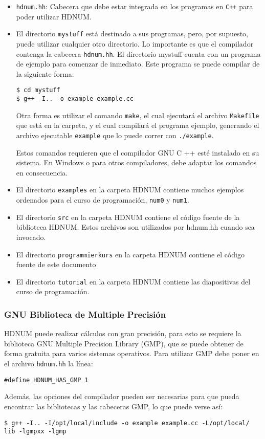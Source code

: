 \documentclass[a4paper,11pt]{article}
\theoremstyle{definition}
\begin{document}
\begin{itemize}
\item \lstinline{hdnum.hh}: Cabecera que debe estar integrada en los programas en \lstinline{C++} para poder utilizar HDNUM.
\item 
El directorio \lstinline{mystuff} está destinado a sus programas, pero, por supuesto, puede utilizar cualquier otro directorio. Lo  importante es que el compilador contenga la cabecera \lstinline{hdnum.hh}. El directorio mystuff cuenta con un programa de ejemplo para comenzar de inmediato. Este programa se puede compilar de la siguiente forma:

\begin{lstlisting}[basicstyle=\ttfamily\small,frame=single]
$ cd mystuff
$ g++ -I.. -o example example.cc
\end{lstlisting}
Otra forma es utilizar el comando \lstinline{make}, el cual ejecutará el archivo \lstinline{Makefile} que está en la carpeta, y el cual compilará el programa ejemplo, generando el archivo ejecutable \lstinline{example} que lo puede correr con \lstinline{./example}.

Estos comandos requieren que el compilador GNU C ++ esté instalado en su sistema. En Windows o para otros compiladores, debe adaptar los comandos en consecuencia.

\item El directorio \lstinline{examples} en la carpeta HDNUM contiene muchos ejemplos ordenados para el curso de programación, \lstinline{num0} y \lstinline{num1}.
\item El directorio \lstinline{src} en la carpeta HDNUM contiene el código fuente de la biblioteca HDNUM. Estos archivos son utilizados por hdnum.hh cuando sea invocado.
\item El directorio \lstinline{programmierkurs} en la carpeta HDNUM contiene el código fuente de este documento
\item El directorio \lstinline{tutorial}  en la carpeta HDNUM contiene las diapositivas del curso de programación.
\end{itemize}

\subsubsection*{GNU Biblioteca de Multiple Precisión}

HDNUM puede realizar cálculos con gran precisión, para esto se requiere la biblioteca GNU Multiple Precision Library (GMP), que se puede obtener de forma gratuita para varios sistemas operativos. Para utilizar GMP debe poner en el archivo \lstinline{hdnum.hh} la línea:
\begin{lstlisting}[basicstyle=\ttfamily\small,frame=single]
#define HDNUM_HAS_GMP 1
\end{lstlisting}
Además, las opciones del compilador pueden ser necesarias para que pueda encontrar las bibliotecas y las cabeceras GMP, lo que puede verse así:
\begin{lstlisting}[basicstyle=\ttfamily\footnotesize,frame=single]
$ g++ -I.. -I/opt/local/include -o example example.cc -L/opt/local/
lib -lgmpxx -lgmp
\end{lstlisting}
\end{document}
